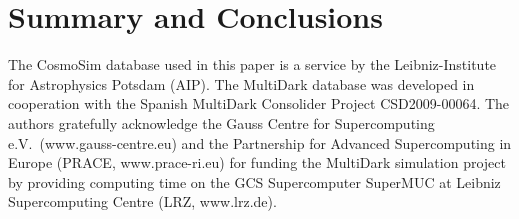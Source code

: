 \documentclass[twocolumn,apj,iop,tighten]{emulateapj2}
\begin{document}
\section{Summary and Conclusions}\label{}


\acknowledgements




The CosmoSim database used in this paper is a service by the Leibniz-Institute for Astrophysics Potsdam (AIP). The MultiDark database was developed in cooperation with the Spanish MultiDark Consolider Project CSD2009-00064.
The authors gratefully acknowledge the Gauss Centre for Supercomputing e.V.\ (www.gauss-centre.eu) and the Partnership for Advanced Supercomputing in Europe (PRACE, www.prace-ri.eu) for funding the MultiDark simulation project by providing computing time on the GCS Supercomputer SuperMUC at Leibniz Supercomputing Centre (LRZ, www.lrz.de).


\end{document}

